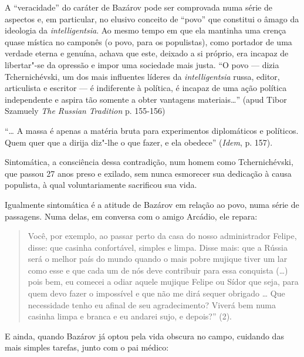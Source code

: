 A ``veracidade'' do caráter de Bazárov pode ser comprovada numa série de
aspectos e, em particular, no elusivo conceito de ``povo'' que constitui
o âmago da ideologia da \emph{intelligentsia}. Ao mesmo tempo em que ela
mantinha uma crença quase mística no camponês (o povo, para os
populistas), como portador de uma verdade eterna e genuína, achava que
este, deixado a si próprio, era incapaz de libertar"-se da opressão e
impor uma sociedade mais justa. ``O povo --- dizia Tchernichévski, um dos
mais influentes líderes da \emph{intelligentsia} russa, editor,
articulista e escritor --- é indiferente à política, é incapaz de uma
ação política independente e aspira tão somente a obter vantagens
materiais\ldots{}'' (apud Tibor Szamuely \emph{The Russian} { }
\emph{Tradition} p. 155-156)

``\ldots{} A massa é apenas a matéria bruta para experimentos diplomáticos e
políticos. Quem quer que a dirija diz"-lhe o que fazer, e ela obedece''
(\emph{Idem}, p. 157).

Sintomática, a consciência dessa contradição, num homem como
Tchernichévski, que passou 27 anos preso e exilado, sem nunca esmorecer
sua dedicação à causa populista, à qual voluntariamente sacrificou sua
vida.

Igualmente sintomática é a atitude de Bazárov em relação ao povo, numa
série de passagens. Numa delas, em conversa com o amigo Arcádio, ele
repara:

\begin{quote}
Você, por exemplo, ao passar perto da casa do nosso administrador
Felipe, disse: que casinha confortável, simples e limpa. Disse mais: que
a Rússia será o melhor país do mundo quando o mais pobre mujique tiver
um lar como esse e que cada um de nós deve contribuir para essa
conquista (\ldots{}) pois bem, eu comecei a odiar aquele mujique Felipe ou
Sídor que seja, para quem devo fazer o impossível e que não me dirá
sequer obrigado \ldots{} Que necessidade tenho eu afinal de seu
agradecimento? Viverá bem numa casinha limpa e branca e eu andarei sujo,
e depois?'' (2).
\end{quote}

E ainda, quando Bazárov já optou pela vida obscura no campo, cuidando
das mais simples tarefas, junto com o pai médico:

